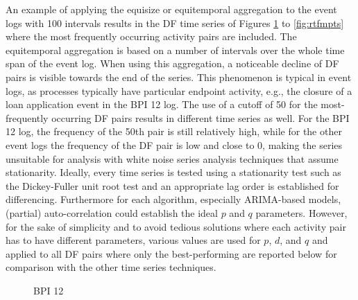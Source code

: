 An example of applying the equisize or equitemporal aggregation to the event logs with 100 intervals results in the DF time series of Figures \ref{fig:bpi12ts} to \ref{fig:rtfmpts} where the most frequently occurring activity pairs are included.
The equitemporal aggregation is based on a number of intervals over the whole time span of the event log.
When using this aggregation, a noticeable decline of DF pairs is visible towards the end of the series.
This phenomenon is typical in event logs, as processes typically have particular endpoint activity, e.g., the closure of a loan application event in the BPI 12 log.
The use of a cutoff of 50 for the most-frequently occurring DF pairs results in different time series as well.
For the BPI 12 log, the frequency of the 50th pair is still relatively high, while for the other event logs the frequency of the DF pair is low and close to 0, making the series unsuitable for analysis with white noise series analysis techniques that assume stationarity.
Ideally, every time series is tested using a stationarity test such as the Dickey-Fuller unit root test \cite{leybourne1995testing} and an appropriate lag order is established for differencing. 
Furthermore for each algorithm, especially ARIMA-based models, (partial) auto-correlation could establish the ideal $p$ and $q$ parameters.
However, for the sake of simplicity and to avoid tedious solutions where each activity pair has to have different parameters, various values are used for $p$, $d$, and $q$ and applied to all DF pairs where only the best-performing are reported below for comparison with the other time series techniques.

\begin{figure}[tb]
	\centering
	\caption{BPI 12}
	\label{fig:bpi12ts}
\end{figure}

